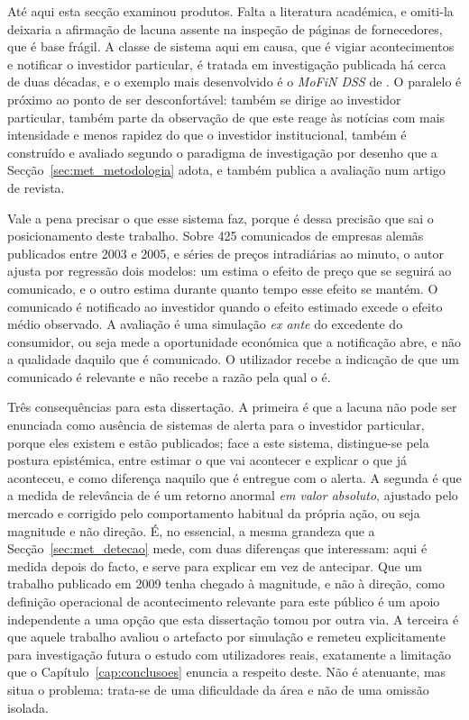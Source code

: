Até aqui esta secção examinou produtos. Falta a literatura académica, e omiti-la deixaria a
afirmação de lacuna assente na inspeção de páginas de fornecedores, que é base frágil. A classe de
sistema aqui em causa, que é vigiar acontecimentos e notificar o investidor particular, é tratada
em investigação publicada há cerca de duas décadas, e o exemplo mais desenvolvido é o \emph{MoFiN
DSS} de \textcite{muntermann2009ubiquitous}. O paralelo é próximo ao ponto de ser desconfortável:
também se dirige ao investidor particular, também parte da observação de que este reage às
notícias com mais intensidade e menos rapidez do que o investidor institucional, também é
construído e avaliado segundo o paradigma de investigação por desenho que a
Secção~\ref{sec:met_metodologia} adota, e também publica a avaliação num artigo de revista.

Vale a pena precisar o que esse sistema faz, porque é dessa precisão que sai o posicionamento
deste trabalho. Sobre 425 comunicados de empresas alemãs publicados entre 2003 e 2005, e séries de
preços intradiárias ao minuto, o autor ajusta por regressão dois modelos: um estima o efeito de
preço que se seguirá ao comunicado, e o outro estima durante quanto tempo esse efeito se
mantém. O comunicado é notificado ao investidor quando o efeito estimado excede o efeito médio
observado. A avaliação é uma simulação \emph{ex ante} do excedente do consumidor, ou seja mede a
oportunidade económica que a notificação abre, e não a qualidade daquilo que é comunicado. O
utilizador recebe a indicação de que um comunicado é relevante e não recebe a razão pela qual o é.

Três consequências para esta dissertação. A primeira é que a lacuna não pode ser enunciada como
ausência de sistemas de alerta para o investidor particular, porque eles existem e estão
publicados; face a este sistema, distingue-se pela postura epistémica, entre estimar o que vai
acontecer e explicar o que já aconteceu, e como diferença naquilo que é entregue com o alerta. A
segunda é que a medida de relevância de \textcite{muntermann2009ubiquitous} é um retorno anormal
\emph{em valor absoluto}, ajustado pelo mercado e corrigido pelo comportamento habitual da própria
ação, ou seja magnitude e não direção. É, no essencial, a mesma grandeza que a
Secção~\ref{sec:met_detecao} mede, com duas diferenças que interessam: aqui é medida depois do
facto, e serve para explicar em vez de antecipar. Que um trabalho publicado em 2009 tenha chegado
à magnitude, e não à direção, como definição operacional de acontecimento relevante para este
público é um apoio independente a uma opção que esta dissertação tomou por outra via. A terceira
é que aquele trabalho avaliou o artefacto por simulação e remeteu explicitamente para investigação
futura o estudo com utilizadores reais, exatamente a limitação que o
Capítulo~\ref{cap:conclusoes} enuncia a respeito deste. Não é atenuante, mas situa o problema:
trata-se de uma dificuldade da área e não de uma omissão isolada.

